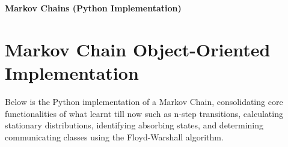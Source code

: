 \begin{center}
    \Large\textbf{\textcolor{primary}{Markov Chains (Python Implementation)}}
\end{center}
\vspace{0.5cm}

\section{\textcolor{secondary}{Markov Chain Object-Oriented Implementation}}

Below is the Python implementation of a Markov Chain, consolidating core functionalities of what learnt till now such as n-step transitions, calculating stationary distributions, identifying absorbing states, and determining communicating classes using the Floyd-Warshall algorithm.


